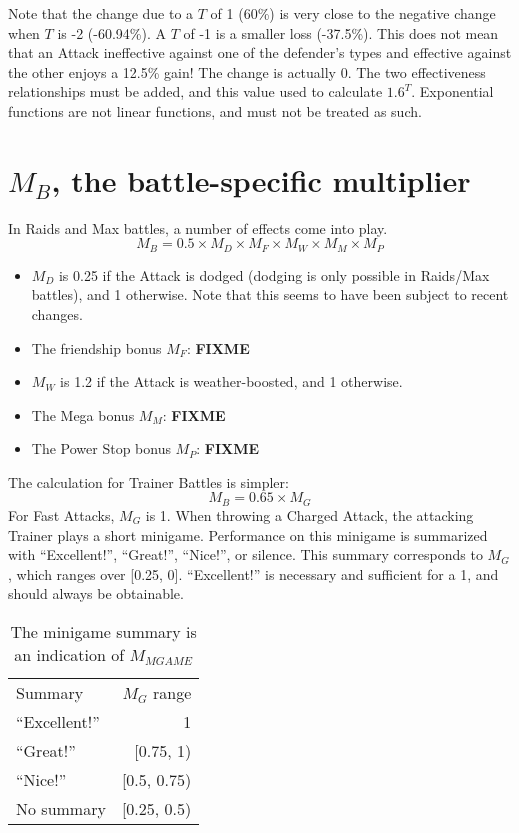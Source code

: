 Note that the change due to a $T$ of 1 (60\%) is very close to the negative change
 when $T$ is -2 (-60.94\%). A $T$ of -1 is a smaller loss (-37.5\%).
This does not mean that an Attack ineffective against one of the defender's types and
 effective against the other enjoys a 12.5\% gain!
The change is actually 0.
The two effectiveness relationships must be added, and this value used to
 calculate $1.6^T$.
Exponential functions are not linear functions, and must not be treated as such.

\section{$M_B$, the battle-specific multiplier}
In Raids and Max battles, a number of effects come into play.
\[ M_B = 0.5 \times M_D \times M_F \times M_W \times M_M \times M_P \]
\begin{itemize}
 \item $M_D$ is 0.25 if the Attack is dodged (dodging is only possible in Raids/Max battles),
 and 1 otherwise. Note that this seems to have been subject to recent changes.
 \item The friendship bonus $M_F$: \textbf{FIXME}
 \item $M_W$ is 1.2 if the Attack is weather-boosted, and 1 otherwise.
 \item The Mega bonus $M_M$: \textbf{FIXME}
 \item The Power Stop bonus $M_P$: \textbf{FIXME}
\end{itemize}
The calculation for Trainer Battles is simpler:
\[ M_B = 0.65 \times M_G \]
For Fast Attacks, $M_G$ is 1.
When throwing a Charged Attack, the attacking Trainer plays a short minigame.
Performance on this minigame is summarized with ``Excellent!'', ``Great!'',
``Nice!'', or silence.
This summary corresponds to $M_G$, which ranges over [0.25, 0].
``Excellent!'' is necessary and sufficient for a 1, and should always be obtainable.

\begin{table}
  \begin{center}
    \begin{tabular}{l r}
      Summary & $M_G$ range \\
      \Midrule
      ``Excellent!'' & 1 \\
      ``Great!'' & [0.75, 1) \\
      ``Nice!'' & [0.5, 0.75) \\
      No summary & [0.25, 0.5) \\
  \end{tabular}
    \caption{The minigame summary is an indication of $M_{MGAME}$}
  \end{center}
\end{table}

